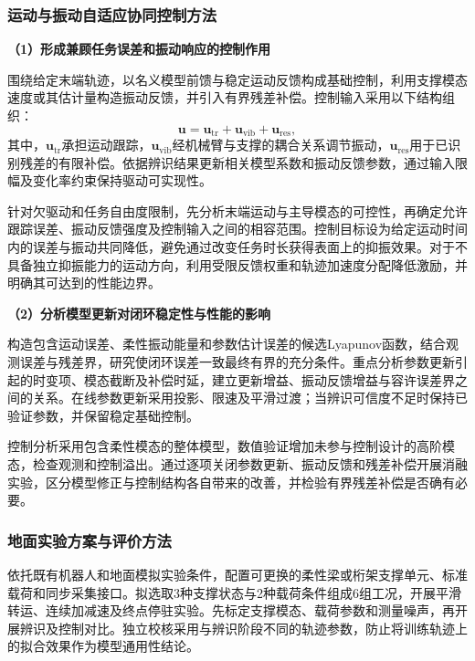 \documentclass[UTF8,a4paper,zihao=-4,fontset=fandol]{ctexart}
\newcommand{\topic}[1]{\par\addvspace{0.5em}\noindent\textbf{#1}\par\nobreak}
\begin{document}
\subsubsection{运动与振动自适应协同控制方法}

\topic{（1）形成兼顾任务误差和振动响应的控制作用}

围绕给定末端轨迹，以名义模型前馈与稳定运动反馈构成基础控制，利用支撑模态速度或其估计量构造振动反馈，并引入有界残差补偿。控制输入采用以下结构组织：
\begin{equation}
 \bm u=\bm u_{\mathrm{tr}}+\bm u_{\mathrm{vib}}+\bm u_{\mathrm{res}},
 \label{eq:control}
\end{equation}
其中，$\bm u_{\mathrm{tr}}$承担运动跟踪，$\bm u_{\mathrm{vib}}$经机械臂与支撑的耦合关系调节振动，$\bm u_{\mathrm{res}}$用于已识别残差的有限补偿。依据辨识结果更新相关模型系数和振动反馈参数，通过输入限幅及变化率约束保持驱动可实现性。

针对欠驱动和任务自由度限制，先分析末端运动与主导模态的可控性，再确定允许跟踪误差、振动反馈强度及控制输入之间的相容范围。控制目标设为给定运动时间内的误差与振动共同降低，避免通过改变任务时长获得表面上的抑振效果。对于不具备独立抑振能力的运动方向，利用受限反馈权重和轨迹加速度分配降低激励，并明确其可达到的性能边界。

\topic{（2）分析模型更新对闭环稳定性与性能的影响}

构造包含运动误差、柔性振动能量和参数估计误差的候选Lyapunov函数，结合观测误差与残差界，研究使闭环误差一致最终有界的充分条件。重点分析参数更新引起的时变项、模态截断及补偿时延，建立更新增益、振动反馈增益与容许误差界之间的关系。在线参数更新采用投影、限速及平滑过渡；当辨识可信度不足时保持已验证参数，并保留稳定基础控制。

控制分析采用包含柔性模态的整体模型，数值验证增加未参与控制设计的高阶模态，检查观测和控制溢出。通过逐项关闭参数更新、振动反馈和残差补偿开展消融实验，区分模型修正与控制结构各自带来的改善，并检验有界残差补偿是否确有必要。

\subsubsection{地面实验方案与评价方法}

依托既有机器人和地面模拟实验条件，配置可更换的柔性梁或桁架支撑单元、标准载荷和同步采集接口。拟选取3种支撑状态与2种载荷条件组成6组工况，开展平滑转运、连续加减速及终点停驻实验。先标定支撑模态、载荷参数和测量噪声，再开展辨识及控制对比。独立校核采用与辨识阶段不同的轨迹参数，防止将训练轨迹上的拟合效果作为模型通用性结论。
\end{document}
